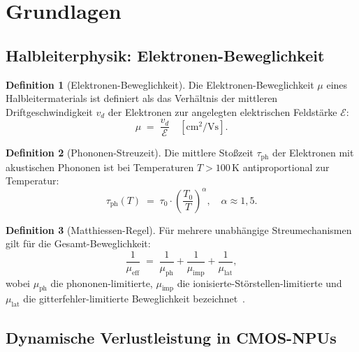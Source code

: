 ﻿\documentclass[a4paper,12pt]{article}
\theoremstyle{definition}
\newtheorem{definition}{Definition}
\begin{document}
\section{Grundlagen}

\subsection{Halbleiterphysik: Elektronen-Beweglichkeit}

\begin{definition}[Elektronen-Beweglichkeit]
Die Elektronen-Beweglichkeit $\mu$ eines Halbleitermaterials ist definiert als das Verhältnis
der mittleren Driftgeschwindigkeit $v_d$ der Elektronen zur angelegten elektrischen Feldstärke
$\mathcal{E}$:
\[
\mu \;=\; \frac{v_d}{\mathcal{E}} \quad [\text{cm}^2/\text{Vs}].
\]
\end{definition}

\begin{definition}[Phononen-Streuzeit]
Die mittlere Stoßzeit $\tau_{\mathrm{ph}}$ der Elektronen mit akustischen Phononen ist
bei Temperaturen $T > 100\,\text{K}$ antiproportional zur Temperatur:
\[
\tau_{\mathrm{ph}}(T) \;=\; \tau_0 \cdot \left(\frac{T_0}{T}\right)^{\alpha}, \quad \alpha \approx 1{,}5.
\]
\end{definition}

\begin{definition}[Matthiessen-Regel]
Für mehrere unabhängige Streumechanismen gilt für die Gesamt-Beweglichkeit:
\[
\frac{1}{\mu_{\mathrm{eff}}} \;=\; \frac{1}{\mu_{\mathrm{ph}}} + \frac{1}{\mu_{\mathrm{imp}}} + \frac{1}{\mu_{\mathrm{lat}}},
\]
wobei $\mu_{\mathrm{ph}}$ die phononen-limitierte, $\mu_{\mathrm{imp}}$ die
ionisierte-Störstellen-limitierte und $\mu_{\mathrm{lat}}$ die gitterfehler-limitierte
Beweglichkeit bezeichnet~\cite{Sze2007}.
\end{definition}

\subsection{Dynamische Verlustleistung in CMOS-NPUs}
\end{document}
